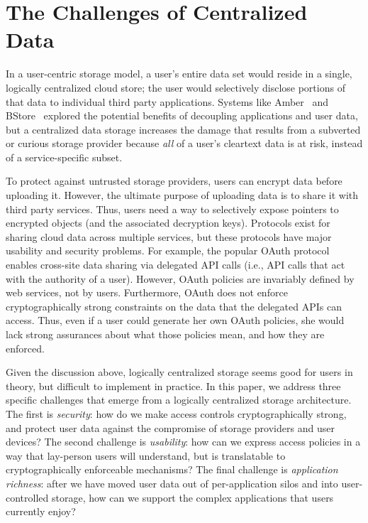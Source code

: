 \section{The Challenges of Centralized Data}

In a user-centric storage model, a user's
entire data set would reside in a single,
logically centralized cloud store; the user
would selectively disclose portions of that
data to individual third party applications.
Systems like Amber~\cite{amber} and BStore~\cite{bstore}
explored the potential benefits of 
decoupling applications and user
data, but a centralized data storage
increases the damage that results from a
subverted or curious storage provider because
\emph{all} of a user's cleartext data is at
risk, instead of a service-specific subset.

To protect against untrusted storage providers,
users can encrypt data before uploading it.
However, the ultimate purpose of uploading
data is to share it with third party services.
Thus, users need a way to selectively expose
pointers to encrypted objects (and the associated
decryption keys). Protocols exist for sharing
cloud data across multiple services, but these
protocols have major usability and security
problems. For example, the popular OAuth
protocol~\cite{oauth} enables cross-site data
sharing via delegated API calls (i.e., API
calls that act with the authority of a user).
However, OAuth policies are invariably defined
by web services, not by users. Furthermore,
OAuth does not enforce cryptographically strong
constraints on the data that the delegated
APIs can access. Thus, even if a user could
generate her own OAuth policies, she would
lack strong assurances about what those policies
mean, and how they are enforced.

Given the discussion above, logically centralized
storage seems good for users in theory, but
difficult to implement in practice. In this
paper, we address three specific challenges
that emerge from a logically centralized storage
architecture. The first is \emph{security}: how
do we make access controls cryptographically
strong, and protect user data against the
compromise of storage providers and user devices?
The second challenge is \emph{usability}: how
can we express access policies in a way that
lay-person users will understand, but is
translatable to cryptographically enforceable
mechanisms? The final challenge is \emph{application
richness}: after we have moved user data out
of per-application silos and into user-controlled
storage, how can we support the complex 
applications that users currently enjoy?


